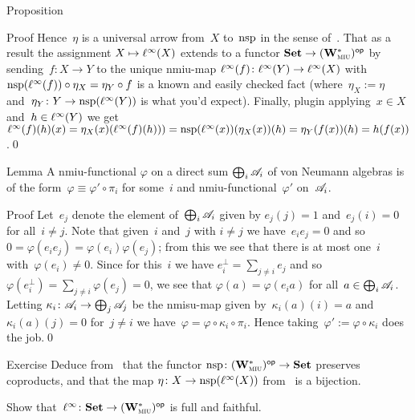 \documentclass[a]{subfiles}
\begin{document}
\begin{parsec}
\begin{point}{Proposition}
\begin{point}{Proof}
Hence~$\eta$ is a universal arrow from~$X$
to~$\mathrm{nsp}$ in the sense of~.
That as a result the assignment $X\mapsto \ell^\infty(X)$
extends to a functor
$\mathbf{Set}\to{(\mathbf{W}^*_{\text{\textsc{miu}}})}{^{\mathsf{op}}}$
by sending~$f\colon X\to Y$
to the unique nmiu-map $\ell^\infty(f)\colon \ell^\infty(Y)\to\ell^\infty(X)$
with $\mathrm{nsp}(\ell^\infty(f))\circ \eta_X = \eta_Y\circ f$
is a known and easily checked fact
(where~$\eta_X:= \eta$ and~$\eta_Y\colon Y\to\mathrm{nsp}(\ell^\infty(Y))$ 
is what you'd expect).
Finally, plugin applying~$x\in X$ and~$h\in \ell^\infty(Y)$
we get
$ \ell^\infty(f)(h)(x)
= \eta_X(x)(\ell^\infty(f)(h)))
=\mathrm{nsp}(\ell^\infty(x))(\eta_X(x))(h)
=\eta_Y(f(x))(h)
=h(f(x))$.\qed
\end{point}
\end{point}
\begin{point}{Lemma}%
A nmiu-functional $\varphi$
on a direct sum $\bigoplus_i \mathscr{A}_i$
of von Neumann algebras
is of the form~$\varphi\equiv \varphi'\circ \pi_i$
for some~$i$ and nmiu-functional~$\varphi'$ on~$\mathscr{A}_i$.
\begin{point}{Proof}%
Let~$e_j$ denote the element of~$\bigoplus_i \mathscr{A}_i$
given by $e_j(j)=1$ and~$e_j(i)=0$ for all~$i\neq j$.
Note that given~$i$ and~$j$ with $i\neq j$
we have~$e_ie_j=0$
and so~$0=\varphi(e_i e_j)=\varphi(e_i)\varphi(e_j)$;
from this we see that
there is at most one~$i$ with~$\varphi(e_i)\neq 0$.
Since for this~$i$
we have $e_i^\perp = \sum_{j\neq i} e_j$
and so~$\varphi(e_i^\perp)=\sum_{j\neq i} \varphi(e_j)=0$,
we see that $\varphi(a)=\varphi(e_i a )$
for all~$a\in \bigoplus_i \mathscr{A}_i$.
Letting  $\kappa_i\colon \mathscr{A}_i\to\bigoplus_j \mathscr{A}_j$
be the nmisu-map given by~$\kappa_i(a)(i)=a$
and~$\kappa_i(a)(j)=0$ for~$j\neq i$
we have~$\varphi = \varphi \circ \kappa_i \circ \pi_i$.
Hence taking~$\varphi':=\varphi\circ \kappa_i$
does the job.\qed
\end{point}
\end{point}
\begin{point}{Exercise}%
Deduce from~
that the functor $\mathrm{nsp}\colon {(\mathbf{W}^*_{\text{\textsc{miu}}})}{^{\mathsf{op}}}\to \mathbf{Set}$
preserves coproducts,
and that the 
map $\eta\colon X\to \mathrm{nsp}(\ell^\infty(X))$
from~ is a bijection.

Show that~$\ell^\infty\colon\mathbf{Set}\to {(\mathbf{W}^*_{\text{\textsc{miu}}})}{^{\mathsf{op}}}$
is full and faithful.
\end{point}

\end{parsec}
\end{document}
